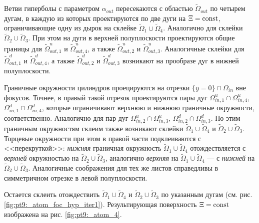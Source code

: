 Ветви гиперболы с параметром $\alpha_{out}$ пересекаются с областью $\widetilde{\Omega}_{out}$ по четырем дугам, в каждую из которых проектируются по две дуги на $\Xi = \mathrm{const}$, ограничивающие одну из дырок на склейке $\widetilde{\Omega}_1 \cup \widetilde{\Omega}_4$. Аналогично для склейки $\widetilde{\Omega}_2 \cup \widetilde{\Omega}_3$. При этом на дуги в верхней полуплоскости проектируются общие границы для $\widetilde{\Omega}_{out, 1}^u$ и $\widetilde{\Omega}_{out, 4}^u$, а также $\widetilde{\Omega}_{out, 2}^u$ и $\widetilde{\Omega}_{out, 3}^u$. Аналогичные склейки для $\widetilde{\Omega}_{out, 1}^d$ и $\widetilde{\Omega}_{out, 4}^d$, а также $\widetilde{\Omega}_{out, 2}^d$ и $\widetilde{\Omega}_{out, 3}^d$ возникают на прообразе дуг в нижней полуплоскости.

Граничные окружности цилиндров проецируются на отрезки $\{y=0\} \cap \Omega_{in}$ вне фокусов. Точнее, в правый такой отрезок проектируются пары дуг $\Omega_{in, 1}^u \cap \Omega_{in, 4}^u$, $\Omega_{in, 1}^d \cap \Omega_{in, 4}^d$, которые ограничивают верхнюю и нижнюю граничные окружности, соответственно. Аналогично для пар дуг $\Omega_{in, 2}^u \cap \Omega_{in, 3}^u$, $\Omega_{in, 2}^d \cap \Omega_{in, 3}^d$. 
По этим граничным окружностям склеим также возникают склейки $\widetilde{\Omega}_1 \cup \widetilde{\Omega}_4$ и $\widetilde{\Omega}_2 \cup \widetilde{\Omega}_3$. 
Торцевые окружности при этом в правой части подклеиваются с <<перекруткой>>: \textit{нижняя} граничная окружность $\widetilde{\Omega}_1 \cup \widetilde{\Omega}_4$ отождествляется с \textit{верхней} окружностью на $\widetilde{\Omega}_2 \cup \widetilde{\Omega}_3$, аналогично \textit{верхняя} на $\widetilde{\Omega}_1 \cup \widetilde{\Omega}_4$ --- с \textit{нижней} на $\widetilde{\Omega}_2 \cup \widetilde{\Omega}_3$.
Аналогичные соображения для тех же листов справедливы в симметричном отрезке в левой полуплоскости.

Остается склеить отождествить $\widetilde{\Omega}_1 \cup \widetilde{\Omega}_4$ и $\widetilde{\Omega}_2 \cup \widetilde{\Omega}_3$ по указанным дугам (см. рис. \ref{fig:pt9:_atom_foc_hyp_iter1}).
%
%
Результирующая поверхность $\Xi = \mathrm{const}$ изображена на рис. \ref{fig:pt9:_atom_4}.

